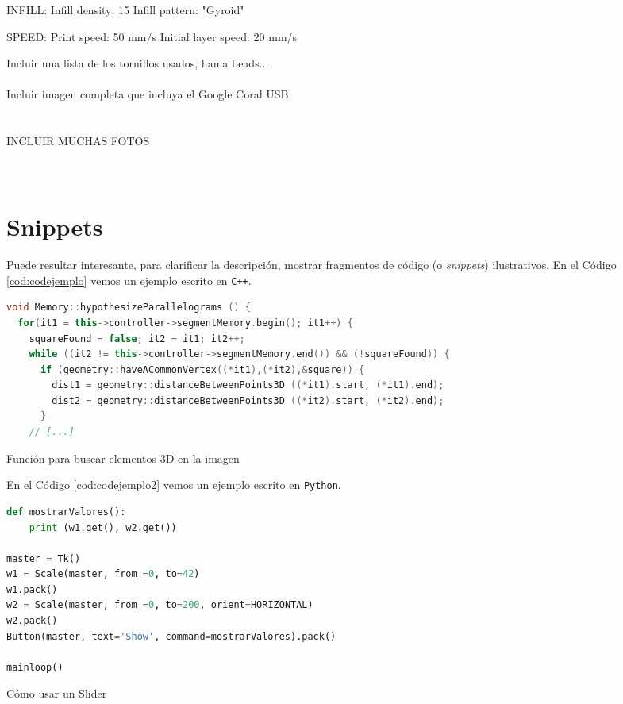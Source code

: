 INFILL:
Infill density: 15%
Infill pattern: "Gyroid"

SPEED:
Print speed: 50 mm/s
Initial layer speed: 20 mm/s


Incluir una lista de los tornillos usados, hama  beads...\\\\



Incluir imagen completa que incluya el Google Coral USB\\\\\\


INCLUIR MUCHAS FOTOS\\\\\\


\section{Snippets}

Puede resultar interesante, para clarificar la descripción, mostrar fragmentos de código (o \textit{snippets}) ilustrativos. En el Código \ref{cod:codejemplo} vemos un ejemplo escrito en \texttt{C++}.

\begin{code}[h]
\begin{lstlisting}[language=C++]
void Memory::hypothesizeParallelograms () {
  for(it1 = this->controller->segmentMemory.begin(); it1++) {
    squareFound = false; it2 = it1; it2++;
    while ((it2 != this->controller->segmentMemory.end()) && (!squareFound)) {
      if (geometry::haveACommonVertex((*it1),(*it2),&square)) {
        dist1 = geometry::distanceBetweenPoints3D ((*it1).start, (*it1).end);
        dist2 = geometry::distanceBetweenPoints3D ((*it2).start, (*it2).end);
      }
    // [...]
\end{lstlisting}
\caption[Función para buscar elementos 3D en la imagen]{Función para buscar elementos 3D en la imagen}
\label{cod:codejemplo}
\end{code}

En el Código \ref{cod:codejemplo2} vemos un ejemplo escrito en \texttt{Python}.

\begin{code}[h]
\begin{lstlisting}[language=Python]
def mostrarValores():
    print (w1.get(), w2.get())

master = Tk()
w1 = Scale(master, from_=0, to=42)
w1.pack()
w2 = Scale(master, from_=0, to=200, orient=HORIZONTAL)
w2.pack()
Button(master, text='Show', command=mostrarValores).pack()

mainloop()
\end{lstlisting}
\caption[Cómo usar un Slider]{Cómo usar un Slider}
\label{cod:codejemplo2}
\end{code}

